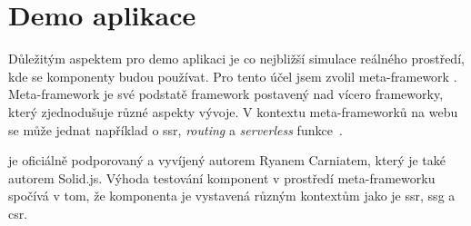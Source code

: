 \section{Demo aplikace}

Důležitým aspektem pro demo aplikaci je co nejbližší simulace reálného prostředí, kde se komponenty budou používat.
Pro tento účel jsem zvolil meta-framework . Meta-framework je své podstatě framework postavený nad vícero frameworky, který zjednodušuje různé aspekty vývoje.
V kontextu meta-frameworků na webu se může jednat například o \gls{ssr}, \textit{routing} a \textit{serverless} funkce~\cite{prismic-metaframework}.

 je oficiálně podporovaný a vyvíjený autorem Ryanem Carniatem, který je také autorem Solid.js.
Výhoda testování komponent v prostředí meta-frameworku spočívá v tom, že komponenta je vystavená různým kontextům jako je \gls{ssr}, \gls{ssg} a \gls{csr}.
